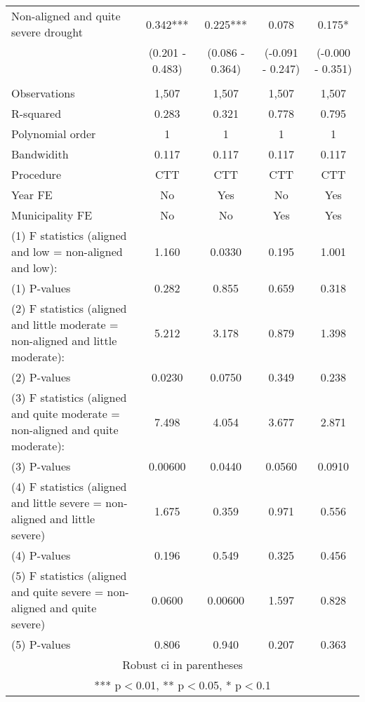 \begin{tabular}{lcccc}
Non-aligned and quite severe drought & 0.342*** & 0.225*** & 0.078 & 0.175* \\
 & (0.201 - 0.483) & (0.086 - 0.364) & (-0.091 - 0.247) & (-0.000 - 0.351) \\
 &  &  &  &  \\
Observations & 1,507 & 1,507 & 1,507 & 1,507 \\
R-squared & 0.283 & 0.321 & 0.778 & 0.795 \\
Polynomial order & 1 & 1 & 1 & 1 \\
Bandwidith & 0.117 & 0.117 & 0.117 & 0.117 \\
Procedure & CTT & CTT & CTT & CTT \\
Year FE & No & Yes & No & Yes \\
Municipality FE & No & No & Yes & Yes \\
(1) F statistics (aligned and low = non-aligned and low): & 1.160 & 0.0330 & 0.195 & 1.001 \\
(1) \hspace{1mm} P-values & 0.282 & 0.855 & 0.659 & 0.318 \\
(2) F statistics (aligned and little moderate = non-aligned and little moderate): & 5.212 & 3.178 & 0.879 & 1.398 \\
(2) \hspace{1mm} P-values & 0.0230 & 0.0750 & 0.349 & 0.238 \\
(3) F statistics (aligned and quite moderate = non-aligned and quite moderate): & 7.498 & 4.054 & 3.677 & 2.871 \\
(3) \hspace{1mm} P-values & 0.00600 & 0.0440 & 0.0560 & 0.0910 \\
(4) F statistics (aligned and little severe = non-aligned and little severe) & 1.675 & 0.359 & 0.971 & 0.556 \\
(4) \hspace{1mm} P-values & 0.196 & 0.549 & 0.325 & 0.456 \\
(5) F statistics (aligned and quite severe = non-aligned and quite severe) & 0.0600 & 0.00600 & 1.597 & 0.828 \\
 (5) \hspace{1mm} P-values & 0.806 & 0.940 & 0.207 & 0.363 \\ \hline
\multicolumn{5}{c}{ Robust ci in parentheses} \\
\multicolumn{5}{c}{ *** p$<$0.01, ** p$<$0.05, * p$<$0.1} \\
\end{tabular}
